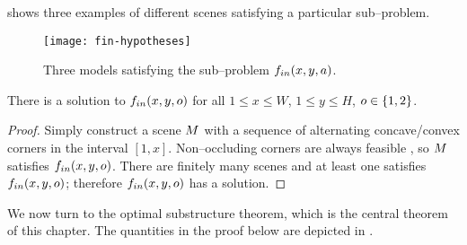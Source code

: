  shows three examples of different scenes
satisfying a particular sub--problem.

\begin{figure}[tb]
  \centering
  \texttt{[image: fin-hypotheses]}
  \caption{Three models satisfying the sub--problem
    $\SubProbIN(x,y,a)$.}
  \label{fig:fin-examples}
\end{figure}

\begin{lemma}
  \label{lemma:solutions-exist}
  There is a solution to $\SubProbIN(x,y,\WallOrient)$ for all $1 \leq x \leq W$,
  $1 \leq y \leq H$, $\WallOrient\in\{1,2\}$.
\end{lemma}
\begin{proof}
  Simply construct a scene $\Scene$ with a sequence of alternating
  concave/convex corners in the interval $[1,x]$. Non--occluding
  corners are always feasible \cite{Lee09}, so $\Scene$ satisfies
  $\SubProbIN(x,y,\WallOrient)$. There are finitely many scenes and at
  least one satisfies $\SubProbIN(x,y,\WallOrient)$; therefore
  $\SubProbIN(x,y,\WallOrient)$ has a solution.
\end{proof}

We now turn to the optimal substructure theorem, which is the central
theorem of this chapter. The quantities in the proof below are
depicted in .

